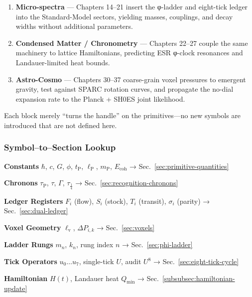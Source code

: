 \documentclass[11pt,oneside]{book}
\begin{document}
\begin{enumerate}[leftmargin=2.3em,itemindent=0pt,label=\textbf{Block \arabic*:}]
  \item \textbf{Micro-spectra} — Chapters 14–21 insert the φ-ladder and
        eight-tick ledger into the Standard-Model sectors, yielding masses,
        couplings, and decay widths without additional parameters.
  \item \textbf{Condensed Matter / Chronometry} — Chapters 22–27 couple the
        same machinery to lattice Hamiltonians, predicting ESR φ-clock
        resonances and Landauer-limited heat bounds.
  \item \textbf{Astro-Cosmo} — Chapters 30–37 coarse-grain voxel pressures to
        emergent gravity, test against SPARC rotation curves, and propagate
        the no-dial expansion rate to the Planck + SH0ES joint likelihood.
\end{enumerate}

Each block merely “turns the handle” on the primitives—no new symbols are
introduced that are not defined here.

\subsubsection{Symbol–to–Section Lookup}
\label{subsubsec:symbol-lookup}
\textbf{Constants}  
\quad $\hbar$, $c$, $G$, $\phi$, $t_{\text{P}}$, $\ell_{\text{P}}$, $m_{\text{P}}$, $E_{\text{coh}}$  
\hfill→ Sec.~\ref{sec:primitive-quantities}

\textbf{Chronons}  
\quad $\tau_{\text{P}}$, $\tau$, $\Gamma$, $\tau_{\tfrac14}$  
\hfill→ Sec.~\ref{sec:recognition-chronons}

\textbf{Ledger Registers}  
\quad $F_{i}$ (flow), $S_{i}$ (stock), $T_{i}$ (transit), $\sigma_{i}$ (parity)  
\hfill→ Sec.~\ref{sec:dual-ledger}

\textbf{Voxel Geometry}  
\quad $\ell_{\mathrm{v}}$, $\Delta P_{i,k}$  
\hfill→ Sec.~\ref{sec:voxels}

\textbf{Ladder Rungs}  
\quad $m_{n}$, $k_{n}$, rung index $n$  
\hfill→ Sec.~\ref{sec:phi-ladder}

\textbf{Tick Operators}  
\quad $u_{0}\dots u_{7}$, single-tick $U$, audit $U^{8}$  
\hfill→ Sec.~\ref{sec:eight-tick-cycle}

\textbf{Hamiltonian}  
\quad $H(t)$, Landauer heat $Q_{\text{min}}$  
\hfill→ Sec.~\ref{subsubsec:hamiltonian-update}
\end{document}
